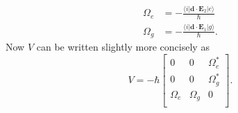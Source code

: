 \begin{align}
\label{RabiFrequencies1}
\Omega_e&=-\frac{\langle i | \mathbf{d}\cdot \mathbf{E}_2 | e\rangle }{\hbar}\\
\Omega_g&=-\frac{\langle i | \mathbf{d}\cdot \mathbf{E}_1 | g\rangle}{\hbar}.
\label{RabiFrequencies2}
\end{align}
Now $V$ can be written slightly more concisely as 
\begin{equation}
\label{VSchrod2}
V=-\hbar
\begin{bmatrix}
0 & 0 & \Omega_e^*\\
0 & 0 & \Omega_g^*\\
\Omega_e & \Omega_g & 0 \\
\end{bmatrix}.
\end{equation}

